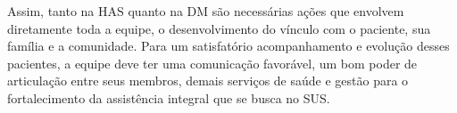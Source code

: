 Assim, tanto na HAS quanto na DM são necessárias ações que envolvem diretamente toda a equipe, o desenvolvimento do vínculo com o paciente, sua família e a comunidade. Para um satisfatório acompanhamento e evolução desses pacientes, a equipe deve ter uma comunicação favorável, um bom poder de articulação entre seus membros, demais serviços de saúde e gestão para o fortalecimento da assistência integral que se busca no SUS.